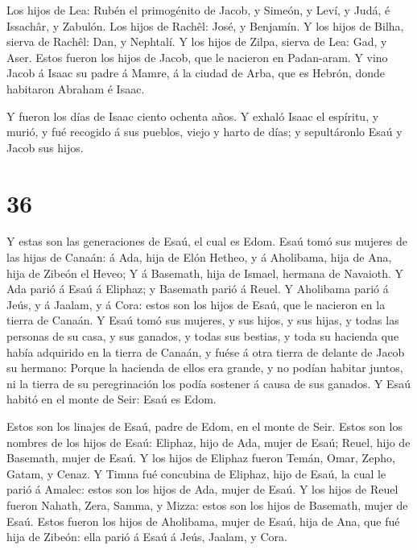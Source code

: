  Los hijos de Lea: Rubén el primogénito de Jacob, y Simeón,
y Leví, y Judá, é Issachâr, y Zabulón.  Los hijos de
Rachêl: José, y Benjamín.  Y los hijos de Bilha, sierva de
Rachêl: Dan, y Nephtalí.  Y los hijos de Zilpa, sierva de
Lea: Gad, y Aser. Estos fueron los hijos de Jacob, que le nacieron en
Padan-aram.  Y vino Jacob á Isaac su padre á Mamre, á la
ciudad de Arba, que es Hebrón, donde habitaron Abraham é Isaac.

 Y fueron los días de Isaac ciento ochenta años.
 Y exhaló Isaac el espíritu, y murió, y fué recogido á sus
pueblos, viejo y harto de días; y sepultáronlo Esaú y Jacob sus hijos.

\hypertarget{section-35}{%
\section{36}\label{section-35}}

 Y estas son las generaciones de Esaú, el cual es Edom.
 Esaú tomó sus mujeres de las hijas de Canaán: á Ada, hija
de Elón Hetheo, y á Aholibama, hija de Ana, hija de Zibeón el Heveo;
 Y á Basemath, hija de Ismael, hermana de Navaioth.
 Y Ada parió á Esaú á Eliphaz; y Basemath parió á Reuel.
 Y Aholibama parió á Jeús, y á Jaalam, y á Cora: estos son
los hijos de Esaú, que le nacieron en la tierra de Canaán. 
Y Esaú tomó sus mujeres, y sus hijos, y sus hijas, y todas las personas
de su casa, y sus ganados, y todas sus bestias, y toda su hacienda que
había adquirido en la tierra de Canaán, y fuése á otra tierra de delante
de Jacob su hermano:  Porque la hacienda de ellos era
grande, y no podían habitar juntos, ni la tierra de su peregrinación los
podía sostener á causa de sus ganados.  Y Esaú habitó en el
monte de Seir: Esaú es Edom.

 Estos son los linajes de Esaú, padre de Edom, en el monte
de Seir.  Estos son los nombres de los hijos de Esaú:
Eliphaz, hijo de Ada, mujer de Esaú; Reuel, hijo de Basemath, mujer de
Esaú.  Y los hijos de Eliphaz fueron Temán, Omar, Zepho,
Gatam, y Cenaz.  Y Timna fué concubina de Eliphaz, hijo de
Esaú, la cual le parió á Amalec: estos son los hijos de Ada, mujer de
Esaú.  Y los hijos de Reuel fueron Nahath, Zera, Samma, y
Mizza: estos son los hijos de Basemath, mujer de Esaú. 
Estos fueron los hijos de Aholibama, mujer de Esaú, hija de Ana, que fué
hija de Zibeón: ella parió á Esaú á Jeús, Jaalam, y Cora.

